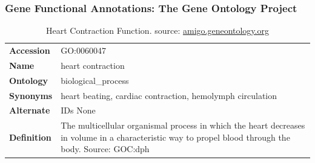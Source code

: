 \documentclass[aspectratio=169, 10pt]{beamer}
\begin{document}
\begin{frame}
\frametitle{Gene Functional Annotations: The Gene Ontology Project}

\begin{table}
\footnotesize
\begin{tabular}{lm{.6\linewidth}}
\toprule
\textbf{Accession} & GO:0060047 \\
\textbf{Name} & heart contraction \\
\textbf{Ontology} & biological\_process \\
\textbf{Synonyms} & heart beating, cardiac contraction, hemolymph circulation \\
\textbf{Alternate} & IDs None \\
\textbf{Definition} & The multicellular organismal process in which the heart decreases in volume in a 
characteristic way to propel blood through the body. Source: GOC:dph \\
\bottomrule
\end{tabular}
\caption{Heart Contraction Function. source: \href{http://amigo.geneontology.org/amigo/term/GO:0060047}{amigo.geneontology.org}}
\end{table}


\end{frame}
\end{document}
